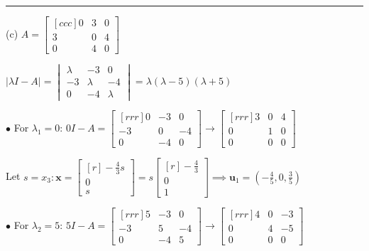 \documentclass{article}
\begin{document}
    {\color{blue9} \rule{20cm}{0.3mm}}

    

    \begin{minipage}{0.54\linewidth}
        (c) $A = \begin{bmatrix}[ccc]
            0 & 3 & 0 \\
            3 & 0 & 4 \\
            0 & 4 & 0 
        \end{bmatrix} $

        $| \lambda I - A| = \begin{vmatrix}
            \lambda  & -3 & 0 \\
            -3 & \lambda  & -4 \\
            0 & -4 & \lambda  
        \end{vmatrix} = \lambda ( \lambda  - 5 )( \lambda  + 5 )$

        $\bullet$ For $ \lambda _1 = 0$: $0I - A = \begin{bmatrix}[rrr]
            0 & -3 & 0 \\
            -3 & 0 & -4 \\
            0 & -4 & 0 
        \end{bmatrix} \to \begin{bmatrix}[rrr]
            3 & 0 & 4 \\
            0 & 1 & 0 \\
            0 & 0 & 0 
        \end{bmatrix} $

        Let $s = x_3: \textbf{x} = \begin{bmatrix}[r]
            -\frac{4}{3}s \\
            0 \\
            s 
        \end{bmatrix} = s \begin{bmatrix}[r]
            - \frac{4}{3} \\
            0 \\
            1 
        \end{bmatrix} \implies \textbf{u}_1 = \left( - \frac{4}{5}, 0, \frac{3}{5} \right)$

        $\bullet$ For $ \lambda _2 = 5$: $5I - A = \begin{bmatrix}[rrr]
            5 & -3 & 0 \\
            -3 & 5 & -4\\
            0 & -4 & 5 
        \end{bmatrix} \to \begin{bmatrix}[rrr]
            4 & 0 & -3 \\
            0 & 4 & -5 \\
            0 & 0 & 0 
        \end{bmatrix}$
        

\end{minipage}
\end{document}
